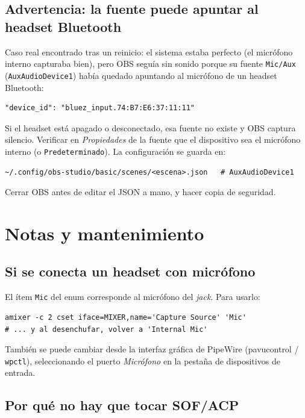 \documentclass[12pt,a4paper]{article}
\begin{document}
\subsection{Advertencia: la fuente puede apuntar al headset Bluetooth}

Caso real encontrado tras un reinicio: el sistema estaba perfecto (el micrófono
interno capturaba bien), pero OBS seguía sin sonido porque su fuente
\texttt{Mic/Aux} (\texttt{AuxAudioDevice1}) había quedado apuntando al
micrófono de un headset Bluetooth:

\begin{lstlisting}[style=bash]
"device_id": "bluez_input.74:B7:E6:37:11:11"
\end{lstlisting}

Si el headset está apagado o desconectado, esa fuente no existe y OBS captura
silencio. Verificar en \emph{Propiedades} de la fuente que el dispositivo sea
el micrófono interno (o \texttt{Predeterminado}). La configuración se guarda
en:

\begin{lstlisting}[style=bash]
~/.config/obs-studio/basic/scenes/<escena>.json   # AuxAudioDevice1
\end{lstlisting}

Cerrar OBS antes de editar el JSON a mano, y hacer copia de seguridad.

\section{Notas y mantenimiento}

\subsection{Si se conecta un headset con micrófono}

El ítem \texttt{Mic} del enum corresponde al micrófono del \emph{jack}. Para
usarlo:

\begin{lstlisting}[style=bash]
amixer -c 2 cset iface=MIXER,name='Capture Source' 'Mic'
# ... y al desenchufar, volver a 'Internal Mic'
\end{lstlisting}

También se puede cambiar desde la interfaz gráfica de PipeWire (pavucontrol /
\texttt{wpctl}), seleccionando el puerto \emph{Micrófono} en la pestaña de
dispositivos de entrada.

\subsection{Por qué no hay que tocar SOF/ACP}
\end{document}
